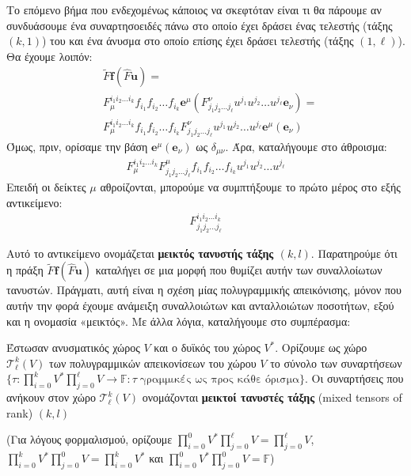 \documentclass[main.tex]{subfiles}
\begin{document}
	Το επόμενο βήμα που ενδεχομένως κάποιος να σκεφτόταν είναι τι θα πάρουμε αν συνδυάσουμε ένα συναρτησοειδές πάνω στο οποίο έχει δράσει ένας τελεστής (τάξης $(k,1)$) του και ένα άνυσμα στο οποίο επίσης έχει δράσει τελεστής (τάξης $(1,\ell)$). Θα έχουμε λοιπόν:
	\begin{align*}
		&\tilde{F}\boldsymbol{f}(\hat{F}\boldsymbol{u}) = \\
		&F_\mu^{i_1i_2\ldots i_k}f_{i_1}f_{i_2}\ldots f_{i_k}\boldsymbol{e}^\mu(F^\nu_{j_1j_2\ldots j_\ell}u^{j_1}u^{j_2}\ldots u^{j_\ell}\boldsymbol{e}_\nu) =\\
		&F_\mu^{i_1i_2\ldots i_k}f_{i_1}f_{i_2}\ldots f_{i_k}F^\nu_{j_1j_2\ldots j_\ell}u^{j_1}u^{j_2}\ldots u^{j_\ell}\boldsymbol{e}^\mu(\boldsymbol{e}_\nu)
	\end{align*}
	Όμως, πριν, ορίσαμε την βάση $\boldsymbol{e}^\mu(\boldsymbol{e}_\nu)$ ως $\delta_{\mu\nu}$. Άρα, καταλήγουμε στο άθροισμα:
	\begin{align*}
		F_\mu^{i_1i_2\ldots i_k}F^\mu_{j_1j_2\ldots j_\ell}f_{i_1}f_{i_2}\ldots f_{i_k}u^{j_1}u^{j_2}\ldots u^{j_\ell}
	\end{align*}
	Επειδή οι δείκτες $\mu$ αθροίζονται, μπορούμε να συμπτήξουμε το πρώτο μέρος στο εξής αντικείμενο:
	\begin{align*}
		F^{i_1i_2\ldots i_k}_{j_1j_2\ldots j_\ell}
	\end{align*}

	Αυτό το αντικείμενο ονομάζεται \textbf{μεικτός τανυστής τάξης $(k,l)$}. Παρατηρούμε ότι η πράξη $\tilde{F}\boldsymbol{f}(\hat{F}\boldsymbol{u})$ καταλήγει σε μια μορφή που θυμίζει αυτήν των συναλλοίωτων τανυστών. Πράγματι, αυτή είναι η σχέση μίας πολυγραμμικής απεικόνισης, μόνον που αυτήν την φορά έχουμε ανάμειξη συναλλοιώτων και ανταλλοιώτων ποσοτήτων, εξού και η ονομασία «μεικτός». Με άλλα λόγια, καταλήγουμε στο συμπέρασμα:
	\begin{definition}
		Έστωσαν ανυσματικός χώρος $V$ και ο δυϊκός του χώρος $V^*$. Ορίζουμε ως χώρο $\mathcal{T}^k_\ell(V)$ των πολυγραμμικών απεικονίσεων του χώρου $V$ το σύνολο των συναρτήσεων ${\{\tau:\prod_{i=0}^{k}V^*\prod_{j=0}^{\ell}V \rightarrow \mathbb{F} : \tau \; \text{γραμμικές ως προς κάθε όρισμα}\}}$. Οι συναρτήσεις που ανήκουν στον χώρο $\mathcal{T}^k_\ell(V)$ ονομάζονται \textbf{μεικτοί τανυστές τάξης} (mixed tensors of rank) $(k,l)$ 
	\end{definition}
	(Για λόγους φορμαλισμού, ορίζουμε $\prod_{i=0}^{0}V^*\prod_{j=0}^{\ell}V = \prod_{j=0}^{\ell}V$, $\prod_{i=0}^{k}V^*\prod_{j=0}^{0}V = \prod_{i=0}^{k}V^*$ και $\prod_{i=0}^{0}V^*\prod_{j=0}^{0}V = \mathbb{F}$)
\end{document}
